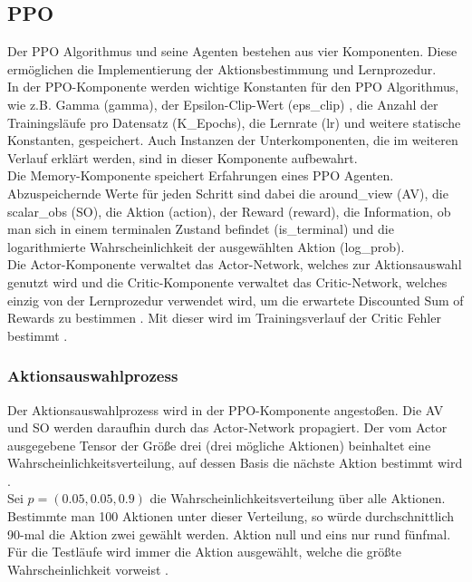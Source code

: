 \subsection{PPO} \label{subsec:Konzept_PPO}
Der PPO Algorithmus und seine Agenten bestehen aus vier Komponenten. Diese ermöglichen die Implementierung der Aktionsbestimmung und Lernprozedur.\\
In der PPO-Komponente werden wichtige Konstanten für den PPO Algorithmus, wie z.B. Gamma (gamma), der Epsilon-Clip-Wert (eps\_clip) , die Anzahl der Trainingsläufe pro Datensatz (K\_Epochs), die Lernrate (lr) und weitere statische Konstanten, gespeichert. Auch Instanzen der Unterkomponenten, die im weiteren Verlauf erklärt werden, sind in dieser Komponente aufbewahrt.\\
Die Memory-Komponente speichert Erfahrungen eines PPO Agenten. Abzuspeichernde Werte für jeden Schritt sind dabei die around\_view (AV), die scalar\_obs (SO), die Aktion (action), der Reward (reward), die Information, ob man sich in einem terminalen Zustand befindet (is\_terminal) und die logarithmierte Wahrscheinlichkeit der ausgewählten Aktion (log\_prob).\\
Die Actor-Komponente verwaltet das Actor-Network, welches zur Aktionsauswahl genutzt wird und die Critic-Komponente verwaltet das Critic-Network, welches einzig von der Lernprozedur verwendet wird, um die erwartete Discounted Sum of Rewards zu bestimmen . Mit dieser wird im Trainingsverlauf der Critic Fehler bestimmt .

\subsubsection{Aktionsauswahlprozess} \label{subsubsec:Konzept_Aktionsauswahlprozess_PPO}
Der Aktionsauswahlprozess wird in der PPO-Komponente angestoßen. Die AV und SO werden daraufhin durch das Actor-Network propagiert. Der vom Actor ausgegebene Tensor der Größe drei (drei mögliche Aktionen) beinhaltet eine Wahrscheinlichkeitsverteilung, auf dessen Basis die nächste Aktion bestimmt wird .\\
Sei $p = (0.05, 0.05, 0.9)$ die Wahrscheinlichkeitsverteilung über alle Aktionen. Bestimmte man 100 Aktionen unter dieser Verteilung, so würde durchschnittlich 90-mal die Aktion zwei gewählt werden. Aktion null und eins nur rund fünfmal.\\
Für die Testläufe wird immer die Aktion ausgewählt, welche die größte Wahrscheinlichkeit vorweist .

